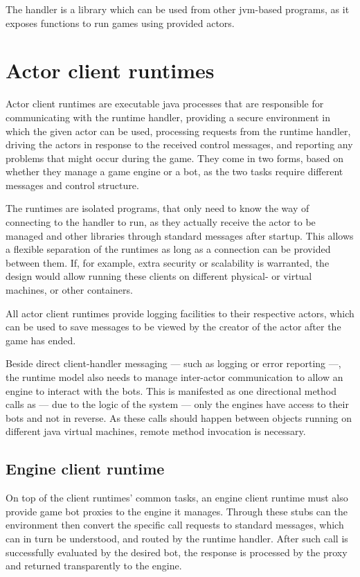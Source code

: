 	The handler is a library which can be used from other jvm-based programs, as it exposes functions to run games using provided actors.
	
	\section{Actor client runtimes}
	
	Actor client runtimes are executable java processes that are responsible for communicating with the runtime handler, providing a secure environment in which the given actor can be used, processing requests from the runtime handler, driving the actors in response to the received control messages, and reporting any problems that might occur during the game.
	They come in two forms, based on whether they manage a game engine or a bot, as the two tasks require different messages and control structure.

	 The runtimes are isolated programs, that only need to know the way of connecting to the handler to run, as they actually receive the actor to be managed and other libraries through standard messages after startup. This allows a flexible separation of the runtimes as long as a connection can be provided between them. If, for example, extra security or scalability is warranted, the design would allow running these clients on different physical- or virtual machines, or other containers.
	
	All actor client runtimes provide logging facilities to their respective actors, which can be used to save messages to be viewed by the creator of the actor after the game has ended.
	
	Beside direct client-handler messaging --- such as logging or error reporting ---, the runtime model also needs to manage inter-actor communication to allow an engine to interact with the bots. This is manifested as one directional method calls as --- due to the logic of the system --- only the engines have access to their bots and not in reverse.
	As these calls should happen between objects running on different java virtual machines, remote method invocation is necessary.
	
		\subsection*{Engine client runtime}
	
		On top of the client runtimes' common tasks, an engine client runtime must also provide game bot proxies to the engine it manages. Through these stubs can the environment then convert the specific call requests to standard messages, which can in turn be understood, and routed by the runtime handler. After such call is successfully evaluated by the desired bot, the response is processed by the proxy and returned transparently to the engine.
	
